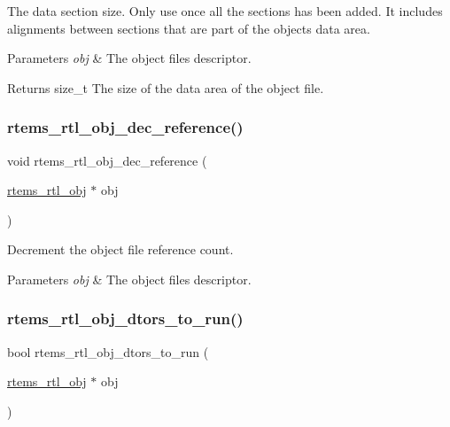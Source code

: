 The data section size. Only use once all the sections has been added. It includes alignments between sections that are part of the object\textquotesingle{}s data area.


\begin{DoxyParams}{Parameters}
{\em obj} & The object file\textquotesingle{}s descriptor. \\
\hline
\end{DoxyParams}
\begin{DoxyReturn}{Returns}
size\+\_\+t The size of the data area of the object file. 
\end{DoxyReturn}
\mbox{\label{rtl-obj_8h_a77c0042ad0312c5043e9d8259171e6f5}} 
\subsubsection{\texorpdfstring{rtems\_rtl\_obj\_dec\_reference()}{rtems\_rtl\_obj\_dec\_reference()}}
{\footnotesize\ttfamily void rtems\+\_\+rtl\+\_\+obj\+\_\+dec\+\_\+reference (\begin{DoxyParamCaption}\item[{\mbox{\hyperlink{structrtems__rtl__obj}{rtems\+\_\+rtl\+\_\+obj}} $\ast$}]{obj }\end{DoxyParamCaption})}

Decrement the object file reference count.


\begin{DoxyParams}{Parameters}
{\em obj} & The object file\textquotesingle{}s descriptor. \\
\hline
\end{DoxyParams}
\mbox{\label{rtl-obj_8h_ae2f95f4733d04acbb018f431340be2db}} 
\subsubsection{\texorpdfstring{rtems\_rtl\_obj\_dtors\_to\_run()}{rtems\_rtl\_obj\_dtors\_to\_run()}}
{\footnotesize\ttfamily bool rtems\+\_\+rtl\+\_\+obj\+\_\+dtors\+\_\+to\+\_\+run (\begin{DoxyParamCaption}\item[{\mbox{\hyperlink{structrtems__rtl__obj}{rtems\+\_\+rtl\+\_\+obj}} $\ast$}]{obj }\end{DoxyParamCaption})}

